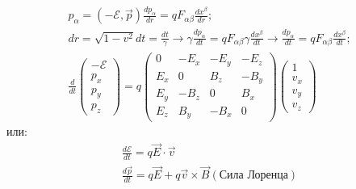 \documentclass[__main__.tex]{subfiles}
\begin{document}
\begin{gather*}
p_\alpha = (- \mathcal E, \vec p)
\frac{dp_\alpha}{dr} = qF_{\alpha\beta}\frac{dx^\beta}{dr};\\
dr = \sqrt{1-v^2}dt = \frac{dt}{\gamma} \rightarrow \gamma\frac{dp_\alpha}{dt} = qF_{\alpha\beta}\gamma\frac{dx^\beta}{dt} \rightarrow \frac{dp_\alpha}{dt} = qF_{\alpha\beta}\frac{dx^\beta}{dt};\\
\frac{d}{dt}\left(\begin{matrix}-\mathcal E\\ p_x\\p_y\\p_z\end{matrix}\right) = 
q\left(\begin{matrix}
0&-E_x&-E_y&-E_z\\
E_x&0&B_z&-B_y\\
E_y&-B_z&0&B_x\\
E_z&B_y&-B_x&0
\end{matrix}\right)\left(\begin{matrix}1\\v_x\\v_y\\v_z\end{matrix}\right)
\end{gather*}
или:
\begin{gather*}
\frac{d\mathcal E}{dt} = q\vec E\cdot \vec v\\
\frac{d\vec p}{dt} = q\vec E + q\vec v \times \vec B (\text{Сила Лоренца})
\end{gather*}
\end{document}
